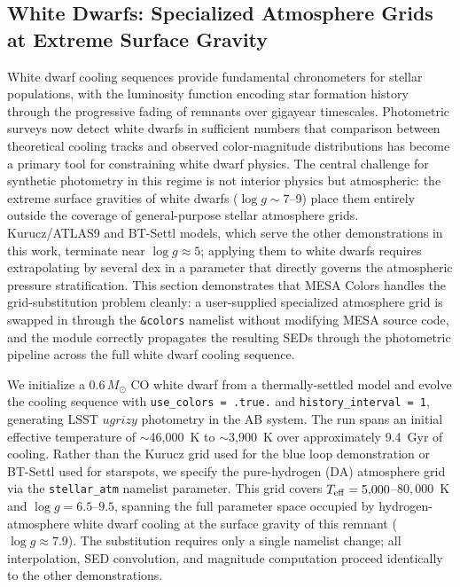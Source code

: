 \documentclass[linenumbers,apj,twocolumn, floatfix]{aastex701} \usepackage{amsmath} \usepackage{longtable} \usepackage{graphicx} \usepackage{ulem} \usepackage{xcolor} \usepackage{lettrine} \usepackage{yfonts} \usepackage{rotating}
\begin{document}
\subsection{White Dwarfs: Specialized Atmosphere Grids at Extreme Surface Gravity}
\label{sec:demo_wd}

White dwarf cooling sequences provide fundamental chronometers for stellar populations, with the luminosity function encoding star formation history through the progressive fading of remnants over gigayear timescales.
Photometric surveys now detect white dwarfs in sufficient numbers that comparison between theoretical cooling tracks and observed color-magnitude distributions has become a primary tool for constraining white dwarf physics.
The central challenge for synthetic photometry in this regime is not interior physics but atmospheric: the extreme surface gravities of white dwarfs ($\log g \sim 7$--9) place them entirely outside the coverage of general-purpose stellar atmosphere grids.
Kurucz/ATLAS9 and BT-Settl models, which serve the other demonstrations in this work, terminate near $\log g \approx 5$; applying them to white dwarfs requires extrapolating by several dex in a parameter that directly governs the atmospheric pressure stratification.
This section demonstrates that MESA Colors handles the grid-substitution problem cleanly: a user-supplied specialized atmosphere grid is swapped in through the \texttt{\&colors} namelist without modifying MESA source code, and the module correctly propagates the resulting SEDs through the photometric pipeline across the full white dwarf cooling sequence.

We initialize a $0.6\,M_\odot$ CO white dwarf from a thermally-settled model and evolve the cooling sequence with \texttt{use\_colors = .true.} and \texttt{history\_interval = 1}, generating LSST $ugrizy$ photometry in the AB system.
The run spans an initial effective temperature of $\sim$46{,}000~K to $\sim$3{,}900~K over approximately 9.4~Gyr of cooling.
Rather than the Kurucz grid used for the blue loop demonstration or BT-Settl used for starspots, we specify the \citet{Koester2010} pure-hydrogen (DA) atmosphere grid via the \texttt{stellar\_atm} namelist parameter.
This grid covers $T_{\rm eff} = 5{,}000$--$80{,}000$~K and $\log g = 6.5$--$9.5$, spanning the full parameter space occupied by hydrogen-atmosphere white dwarf cooling at the surface gravity of this remnant ($\log g \approx 7.9$).
The substitution requires only a single namelist change; all interpolation, SED convolution, and magnitude computation proceed identically to the other demonstrations.
\end{document}

